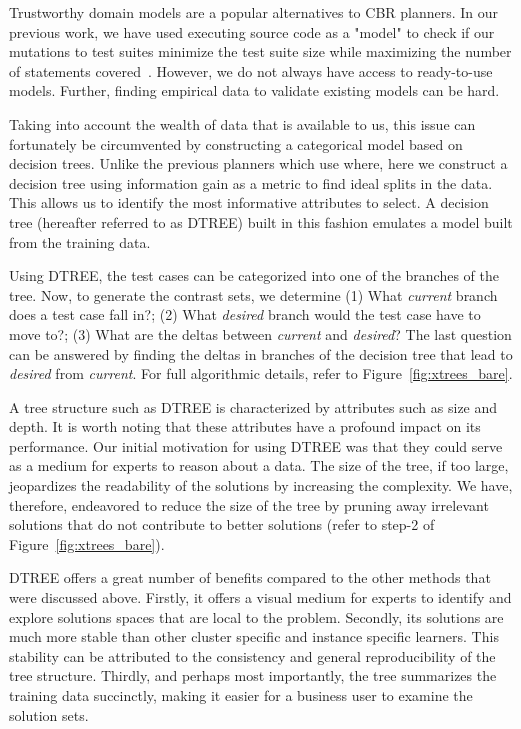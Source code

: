 \documentclass{sig-alternate}
\newcommand{\fig}[1]{Figure~\ref{fig:#1}}
\begin{document}
Trustworthy domain models are a popular alternatives to CBR planners. In our previous work, we have used executing source code as a "model" to check if our mutations to test suites minimize the test suite size while maximizing the number of statements covered~\cite{me09m,andrews07,andrews10}. However, we do not always have access to ready-to-use models. Further, finding empirical data to validate existing models can be hard. 

Taking into account the wealth of data that is available to us, this issue can fortunately be circumvented by constructing a categorical model based on decision trees. Unlike the previous planners which use where, here we construct a decision tree using information gain as a metric to find ideal splits in the data. This allows us to identify the most informative attributes to select. A decision tree (hereafter referred to as DTREE) built in this fashion emulates a model built from the training data. 

Using DTREE, the test cases can be categorized into one of the branches of the tree. Now, to generate the contrast sets, we determine (1) What \textit{current} branch does a test case fall in?; (2) What \textit{desired} branch would the test case have to move to?; (3) What are the deltas between \textit{current} and \textit{desired}? The last question can be answered by finding the deltas in branches of the decision tree that lead to \textit{desired} from \textit{current}. For full algorithmic details, refer to \fig{xtrees_bare}.

A tree structure such as DTREE is characterized by attributes such as size and depth. It is worth noting that these attributes have a profound impact on its performance. Our initial motivation for using DTREE was that they could serve as a medium for experts to reason about a data. The size of the tree, if too large, jeopardizes the readability of the solutions by increasing the complexity. We have, therefore, endeavored to reduce the size of the tree by pruning away irrelevant solutions that do not contribute to better solutions (refer to step-2 of \fig{xtrees_bare}). 

DTREE offers a great number of benefits compared to the other methods that were discussed above. Firstly, it offers a visual medium for experts to identify and explore solutions spaces that are local to the problem. Secondly, its solutions are much more stable than other cluster specific and instance specific learners. This stability can be attributed to the consistency and general reproducibility of the tree structure. Thirdly, and perhaps most importantly, the tree summarizes the training data succinctly, making it easier for a business user to examine the solution sets.
\end{document}
